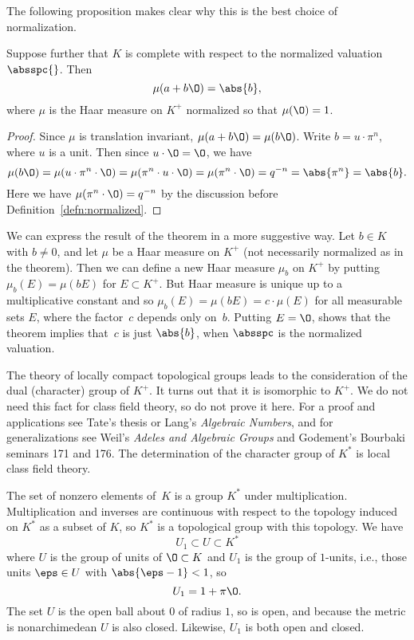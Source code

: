 The following proposition makes clear why this is the best choice of
normalization.
\begin{theorem}
Suppose further that $K$ is complete with respect to the normalized
valuation $\absspc{}$.  Then 
$$
\mu(a + b\O) = \abs{b},
$$
where $\mu$ is the Haar measure on $K^+$ normalized so
that $\mu(\O)=1$.
\end{theorem}
\begin{proof}
Since $\mu$ is translation invariant, $\mu(a+b\O) = \mu(b\O)$.
Write $b=u\cdot \pi^n$, where $u$ is a unit. Then since $u\cdot
\O=\O$, we have
$$\mu(b\O) 
  = \mu(u\cdot \pi^n\cdot \O) = \mu(\pi^n \cdot u\cdot\O)
    = \mu(\pi^n\cdot \O) = q^{-n} = \abs{\pi^n} = \abs{b}.
$$
Here we have $\mu(\pi^n\cdot \O) = q^{-n}$ by the discussion
before Definition~\ref{defn:normalized}.
\end{proof}

We can express the result of the theorem in a more suggestive way.
Let $b\in K$ with $b\neq 0$, and let $\mu$ be a Haar measure on $K^+$
(not necessarily normalized as in the theorem).  Then we can define a
new Haar measure $\mu_b$ on $K^+$ by putting $\mu_b(E) = \mu(bE)$ for
$E\subset K^+$.  But Haar measure is unique up to a multiplicative
constant and so $\mu_b(E) = \mu(bE) = c\cdot \mu(E)$ for all
measurable sets $E$, where the factor~$c$ depends only on~$b$.
Putting $E=\O$, shows that the theorem implies that~$c$ is just
$\abs{b}$, when $\absspc$ is the normalized valuation.

\begin{remark}
  The theory of locally compact topological groups leads to the
  consideration of the dual (character) group of $K^+$.  It turns out
  that it is isomorphic to $K^+$.  We do not need this fact for class
  field theory, so do not prove it here.  For a proof and applications
  see Tate's thesis or Lang's {\em Algebraic Numbers}, and for
  generalizations see Weil's {\em Adeles and Algebraic Groups} and
  Godement's Bourbaki seminars 171 and 176.  The determination of the
  character group of $K^*$ is local class field theory.
\end{remark} 

The set of nonzero elements of~$K$ is a group $K^*$ under
multiplication.  Multiplication and inverses are continuous with
respect to the topology induced on $K^*$ as a subset of $K$, so $K^*$
is a topological group with this topology.  We have 
$$
  U_1 \subset U \subset K^*
  $$
  where $U$ is the group of units of $\O\subset K$ and $U_1$ is
  the group of $1$-units, i.e., those units $\eps\in U$ with
  $\abs{\eps-1}<1$, so
  $$U_1 = 1 + \pi\O.$$
  The set $U$ is the open ball about $0$ of
  radius $1$, so is open, and because the metric is nonarchimedean $U$
  is also closed.  Likewise, $U_1$ is both open and closed.

